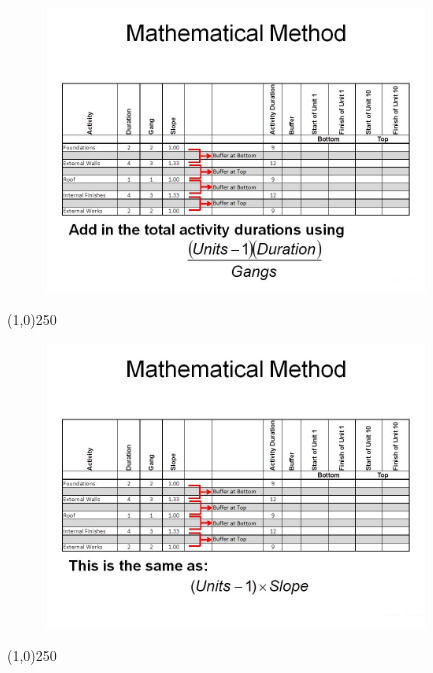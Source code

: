 \begin{frame}
\begin{figure}
	\centering
		\includegraphics[width = 10.0cm]{oldnotes/Slide279.jpg}
\end{figure}
\end{frame}
\begin{center}\line(1,0){250}\end{center}






\begin{frame}
\begin{figure}
	\centering
		\includegraphics[width = 10.0cm]{oldnotes/Slide280.jpg}
\end{figure}
\end{frame}
\begin{center}\line(1,0){250}\end{center}






